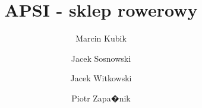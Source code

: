 \documentclass[12pt,oneside,a4paper]{article}
\begin{document}
\author{Marcin Kubik}
\author{Jacek Sosnowski}
\author{Jacek Witkowski}
\author{Piotr Zapa�nik}
\title{APSI - sklep rowerowy}

\clearpage
\tableofcontents
\clearpage



\end{document}
